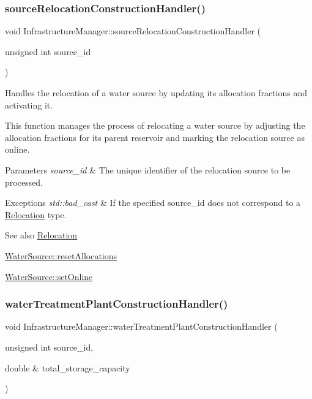 \subsubsection{\texorpdfstring{source\+Relocation\+Construction\+Handler()}{sourceRelocationConstructionHandler()}}
{\footnotesize\ttfamily void Infrastructure\+Manager\+::source\+Relocation\+Construction\+Handler (\begin{DoxyParamCaption}\item[{unsigned int}]{source\+\_\+id }\end{DoxyParamCaption})}



Handles the relocation of a water source by updating its allocation fractions and activating it. 

This function manages the process of relocating a water source by adjusting the allocation fractions for its parent reservoir and marking the relocation source as online.


\begin{DoxyParams}{Parameters}
{\em source\+\_\+id} & The unique identifier of the relocation source to be processed.\\
\hline
\end{DoxyParams}

\begin{DoxyExceptions}{Exceptions}
{\em std\+::bad\+\_\+cast} & If the specified {\ttfamily source\+\_\+id} does not correspond to a {\ttfamily \mbox{\hyperlink{classRelocation}{Relocation}}} type.\\
\hline
\end{DoxyExceptions}
\begin{DoxySeeAlso}{See also}
\mbox{\hyperlink{classRelocation}{Relocation}} 

\mbox{\hyperlink{classWaterSource_afe2f6b96383abdb14563db279a261a31}{Water\+Source\+::reset\+Allocations}} 

\mbox{\hyperlink{classWaterSource_aaa55dc6e14ff184380300147b53c56ec}{Water\+Source\+::set\+Online}} 
\end{DoxySeeAlso}
\mbox{\label{classInfrastructureManager_ad40c7049e76f7d097f1dd066c84d5c79}} 
\subsubsection{\texorpdfstring{water\+Treatment\+Plant\+Construction\+Handler()}{waterTreatmentPlantConstructionHandler()}}
{\footnotesize\ttfamily void Infrastructure\+Manager\+::water\+Treatment\+Plant\+Construction\+Handler (\begin{DoxyParamCaption}\item[{unsigned int}]{source\+\_\+id,  }\item[{double \&}]{total\+\_\+storage\+\_\+capacity }\end{DoxyParamCaption})}



